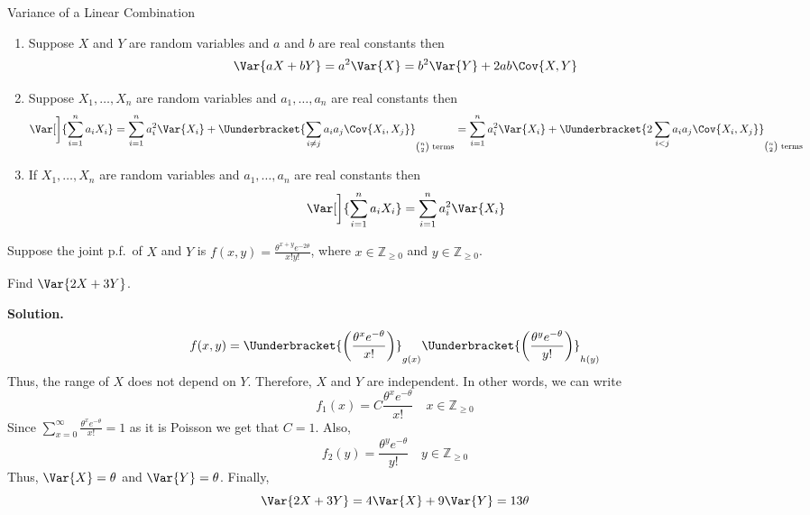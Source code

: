 \begin{Theorem}{Variance of a Linear Combination}{}
    \begin{enumerate}[label=(\arabic*)]
        \item Suppose $ X $ and $ Y $ are random variables
              and $ a $ and $ b $ are real constants then
              \[ \Var{aX+bY}=a^2\Var{X}=b^2\Var{Y}+2ab\Cov{X,Y} \]
        \item Suppose $ X_1,\ldots,X_n $ are random variables
              and $ a_1,\ldots,a_n $ are real constants then
              \[ \Var[\bigg]{\sum_{i=1}^{n} a_i X_i}=
                  \sum_{i=1}^{n} a_i^2 \Var{X_i}+\Uunderbracket{\sum_{i\neq j}a_i a_j\Cov{X_i,X_j}}_{\binom{n}{2}\text{ terms}}=
                  \sum_{i=1}^{n} a_i^2\Var{X_i}
                  +\Uunderbracket{2\sum_{i<j}a_i a_j\Cov{X_i,X_j}}_{\binom{n}{2}\text{ terms}} \]
        \item If $ X_1,\ldots,X_n $ are random variables
              and $ a_1,\ldots,a_n $ are real constants then
              \[ \Var[\bigg]{\sum_{i=1}^{n} a_i X_i}=\sum_{i=1}^{n} a_i^2\Var{X_i} \]
    \end{enumerate}
\end{Theorem}
\begin{Example}{}{}
    Suppose the joint p.f.\ of $ X $ and $ Y $ is
    $ \displaystyle f(x,y)=\frac{\theta^{x+y}e^{-2\theta}}{x!y!} $,
    where $ x\in\mathbb{Z}_{\ge 0} $ and $ y\in\mathbb{Z}_{\ge 0} $.

    Find $ \Var{2X+3Y} $.

    \textbf{Solution.}
    \[ f(x,y)=\Uunderbracket{\left( \frac{\theta^x e^{-\theta}}{x!} \right)}_{g(x)}
        \Uunderbracket{\left( \frac{\theta^y e^{-\theta}}{y!} \right)}_{h(y)} \]
    Thus, the range of $ X $ does not depend on $ Y $. Therefore,
    $ X $ and $ Y $ are independent. In other words, we can write
    \[ f_1(x)=C \frac{\theta^x e^{-\theta}}{x!} \quad x\in\mathbb{Z}_{\ge 0}\]
    Since $ \displaystyle \sum_{x=0}^{\infty} \frac{\theta^x e^{-\theta}}{x!} =1 $
    as it is Poisson we get that $ C=1 $. Also,
    \[ f_2(y)=\frac{\theta^y e^{-\theta}}{y!}\quad y\in\mathbb{Z}_{\ge 0} \]
    Thus, $ \Var{X}=\theta $ and $ \Var{Y}=\theta $. Finally,
    \[ \Var{2X+3Y}=4\Var{X}+9\Var{Y}=13\theta \]
\end{Example}
